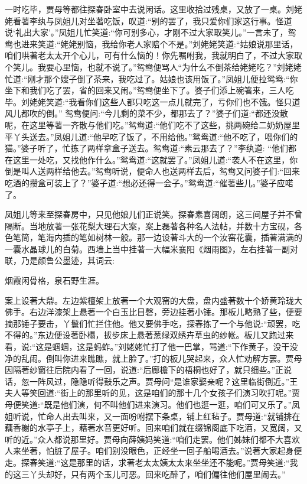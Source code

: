 \begin{parag}
    一时吃毕，贾母等都往探春卧室中去说闲话。这里收拾过残桌，又放了一桌。刘姥姥看著李纨与凤姐儿对坐著吃饭，叹道:“别的罢了，我只爱你们家这行事。怪道说‘礼出大家’。”凤姐儿忙笑道:“你可别多心，才刚不过大家取笑儿。”一言未了，鸳鸯也进来笑道:“姥姥别恼，我给你老人家赔个不是。”刘姥姥笑道:“姑娘说那里话，咱们哄著老太太开个心儿，可有什么恼的！你先嘱咐我，我就明白了，不过大家取个笑儿。我要心里恼，也就不说了。”鸳鸯便骂人“为什么不倒茶给姥姥吃？”刘姥姥忙道:“刚才那个嫂子倒了茶来，我吃过了。姑娘也该用饭了。”凤姐儿便拉鸳鸯:“你坐下和我们吃了罢，省的回来又闹。”鸳鸯便坐下了。婆子们添上碗箸来，三人吃毕。刘姥姥笑道:“我看你们这些人都只吃这一点儿就完了，亏你们也不饿。怪只道风儿都吹的倒。” 鸳鸯便问:“今儿剩的菜不少，都那去了？”婆子们道:“都还没散呢，在这里等著一齐散与他们吃。”鸳鸯道:“他们吃不了这些，挑两碗给二奶奶屋里平丫头送去。”凤姐儿道:“他早吃了饭了，不用给他。”鸳鸯道:“他不吃了，喂你们的猫。”婆子听了，忙拣了两样拿盒子送去。鸳鸯道:“素云那去了？”李纨道: “他们都在这里一处吃，又找他作什么。”鸳鸯道:“这就罢了。”凤姐儿道:“袭人不在这里，你倒是叫人送两样给他去。”鸳鸯听说，便命人也送两样去后，鸳鸯又问婆子们:“回来吃酒的攒盒可装上了？”婆子道:“想必还得一会子。”鸳鸯道:“催著些儿。”婆子应喏了。
\end{parag}


\begin{parag}
    凤姐儿等来至探春房中，只见他娘儿们正说笑。探春素喜阔朗，这三间屋子并不曾隔断。当地放著一张花梨大理石大案，案上磊著各种名人法帖，并数十方宝砚，各色笔筒，笔海内插的笔如树林一般。那一边设著斗大的一个汝窑花囊，插著满满的一囊水晶球儿的白菊。西墙上当中挂著一大幅米襄阳《烟雨图》，左右挂著一副对联，乃是颜鲁公墨迹，其词云:
\end{parag}


\begin{poem}
    \begin{pl}烟霞闲骨格，泉石野生涯。\end{pl}
\end{poem}


\begin{parag}
    案上设著大鼎。左边紫檀架上放著一个大观窑的大盘，盘内盛著数十个娇黄玲珑大佛手。右边洋漆架上悬著一个白玉比目磬，旁边挂著小锤。那板儿略熟了些，便要摘那锤子要击，丫鬟们忙拦住他。他又要佛手吃，探春拣了一个与他说:“顽罢，吃不得的。”东边便设著卧榻，拔步床上悬著葱绿双绣卉草虫的纱帐。板儿又跑过来看，说:“这是蝈蝈，这是蚂蚱。”刘姥姥忙打了他一巴掌，骂道:“下作黄子，没干没净的乱闹。倒叫你进来瞧瞧，就上脸了。”打的板儿哭起来，众人忙劝解方罢。贾母因隔著纱窗往后院内看了一回，说道:“后廊檐下的梧桐也好了，就只细些。”正说话，忽一阵风过，隐隐听得鼓乐之声。贾母问“是谁家娶亲呢？这里临街倒近。”王夫人等笑回道:“街上的那里听的见，这是咱们的那十几个女孩子们演习吹打呢。”贾母便笑道:“既是他们演，何不叫他们进来演习。他们也逛一逛，咱们可又乐了。”凤姐听说，忙命人出去叫来，又一面吩咐摆下条桌，铺上红毡子。贾母道:“就铺排在藕香榭的水亭子上，藉著水音更好听。回来咱们就在缀锦阁底下吃酒，又宽阔，又听的近。”众人都说那里好。贾母向薛姨妈笑道:“咱们走罢。他们姊妹们都不大喜欢人来坐著，怕脏了屋子。咱们别没眼色，正经坐一回子船喝酒去。”说著大家起身便走。探春笑道:“这是那里的话，求著老太太姨太太来坐坐还不能呢。”贾母笑道:“我的这三丫头却好，只有两个玉儿可恶。回来吃醉了，咱们偏往他们屋里闹去。”
\end{parag}


